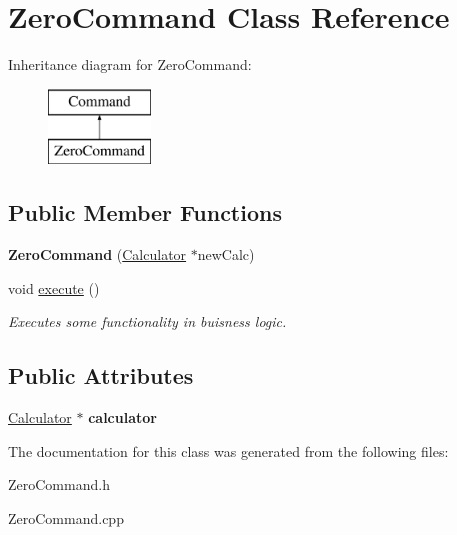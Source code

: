 \hypertarget{class_zero_command}{}\section{Zero\+Command Class Reference}
\label{class_zero_command}
Inheritance diagram for Zero\+Command\+:\begin{figure}[H]
\begin{center}
\leavevmode
\includegraphics[height=2.000000cm]{class_zero_command}
\end{center}
\end{figure}
\subsection*{Public Member Functions}
\begin{DoxyCompactItemize}
\item 
\hypertarget{class_zero_command_aead23519dff0be47aaab54ebc6f6a2cf}{}{\bfseries Zero\+Command} (\hyperlink{class_calculator}{Calculator} $\ast$new\+Calc)\label{class_zero_command_aead23519dff0be47aaab54ebc6f6a2cf}

\item 
\hypertarget{class_zero_command_ad36f2d99253252274f1bfaa3c5d81c7b}{}void \hyperlink{class_zero_command_ad36f2d99253252274f1bfaa3c5d81c7b}{execute} ()\label{class_zero_command_ad36f2d99253252274f1bfaa3c5d81c7b}

\begin{DoxyCompactList}\small\item\em Executes some functionality in buisness logic. \end{DoxyCompactList}\end{DoxyCompactItemize}
\subsection*{Public Attributes}
\begin{DoxyCompactItemize}
\item 
\hypertarget{class_zero_command_ad478b56405cd23b5c4a597a0c320bef0}{}\hyperlink{class_calculator}{Calculator} $\ast$ {\bfseries calculator}\label{class_zero_command_ad478b56405cd23b5c4a597a0c320bef0}

\end{DoxyCompactItemize}


The documentation for this class was generated from the following files\+:\begin{DoxyCompactItemize}
\item 
Zero\+Command.\+h\item 
Zero\+Command.\+cpp\end{DoxyCompactItemize}
